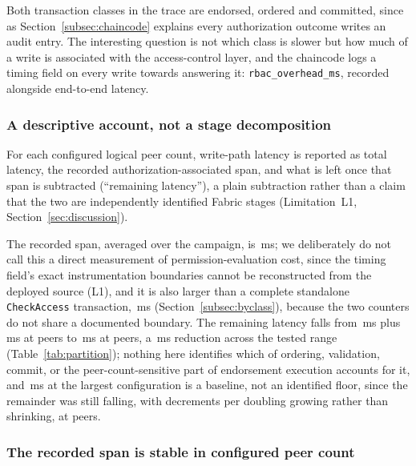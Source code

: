 \documentclass[a4paper,fleqn]{cas-sc}
\begin{document}
Both transaction classes in the trace are endorsed, ordered and committed,
since as Section~\ref{subsec:chaincode} explains every authorization outcome
writes an audit entry. The interesting question is not which class is
slower but how much of a write is associated with the access-control layer,
and the chaincode logs a timing field on every write towards answering it:
\texttt{rbac\_overhead\_ms}, recorded alongside end-to-end latency.

\subsubsection{A descriptive account, not a stage decomposition}
\label{subsubsec:partition}

For each configured logical peer count, write-path latency is reported as
total latency, the recorded authorization-associated span, and what is
left once that span is subtracted (``remaining latency''), a plain
subtraction rather than a claim that the two are independently identified
Fabric stages (Limitation~L1, Section~\ref{sec:discussion}).

The recorded span, averaged over the campaign, is \PartAccess\,ms; we
deliberately do not call this a direct measurement of permission-evaluation
cost, since the timing field's exact instrumentation boundaries cannot be
reconstructed from the deployed source (L1), and it is also larger than a
complete standalone \texttt{CheckAccess} transaction, \DecisionMean\,ms
(Section~\ref{subsec:byclass}), because the two counters do not share a
documented boundary. The remaining latency falls from \PartRemainder\,ms
plus \PartEndorser\,ms at \ScaleMinPeers{} peers to \PartRemainder\,ms at
\ScaleMaxPeers{} peers, a \PartEndorser\,ms reduction across the tested
range (Table~\ref{tab:partition}); nothing here identifies which of
ordering, validation, commit, or the peer-count-sensitive part of
endorsement execution accounts for it, and \PartRemainder\,ms at the
largest configuration is a baseline, not an identified floor, since the
remainder was still falling, with decrements per doubling growing rather
than shrinking, at \ScaleMaxPeers{} peers.



\subsubsection{The recorded span is stable in configured peer count}
\label{subsubsec:acinvariance}
\end{document}
